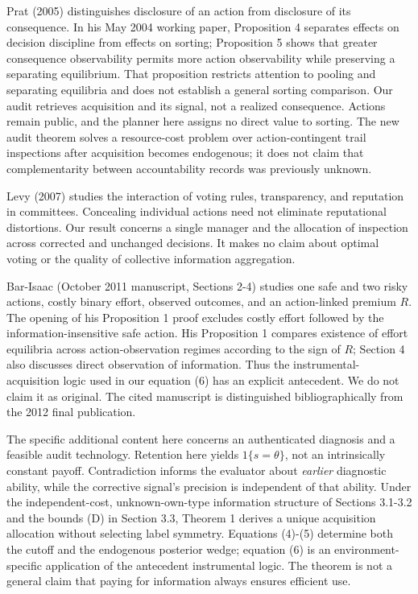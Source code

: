 \documentclass[
  11pt,
]{article}
\begin{document}
Prat (2005) distinguishes disclosure of an action from disclosure of its
consequence. In his May 2004 working paper, Proposition 4 separates
effects on decision discipline from effects on sorting; Proposition 5
shows that greater consequence observability permits more action
observability while preserving a separating equilibrium. That
proposition restricts attention to pooling and separating equilibria and
does not establish a general sorting comparison. Our audit retrieves
acquisition and its signal, not a realized consequence. Actions remain
public, and the planner here assigns no direct value to sorting. The new
audit theorem solves a resource-cost problem over action-contingent
trail inspections after acquisition becomes endogenous; it does not
claim that complementarity between accountability records was previously
unknown.

Levy (2007) studies the interaction of voting rules, transparency, and
reputation in committees. Concealing individual actions need not
eliminate reputational distortions. Our result concerns a single manager
and the allocation of inspection across corrected and unchanged
decisions. It makes no claim about optimal voting or the quality of
collective information aggregation.

Bar-Isaac (October 2011 manuscript, Sections 2-4) studies one safe and
two risky actions, costly binary effort, observed outcomes, and an
action-linked premium \(R\). The opening of his Proposition 1 proof
excludes costly effort followed by the information-insensitive safe
action. His Proposition 1 compares existence of effort equilibria across
action-observation regimes according to the sign of \(R\); Section 4
also discusses direct observation of information. Thus the
instrumental-acquisition logic used in our equation (6) has an explicit
antecedent. We do not claim it as original. The cited manuscript is
distinguished bibliographically from the 2012 final publication.

The specific additional content here concerns an authenticated diagnosis
and a feasible audit technology. Retention here yields
\(1\{s=\theta\}\), not an intrinsically constant payoff. Contradiction
informs the evaluator about \emph{earlier} diagnostic ability, while the
corrective signal's precision is independent of that ability. Under the
independent-cost, unknown-own-type information structure of Sections
3.1-3.2 and the bounds (D) in Section 3.3, Theorem 1 derives a unique
acquisition allocation without selecting label symmetry. Equations
(4)-(5) determine both the cutoff and the endogenous posterior wedge;
equation (6) is an environment-specific application of the antecedent
instrumental logic. The theorem is not a general claim that paying for
information always ensures efficient use.
\end{document}
